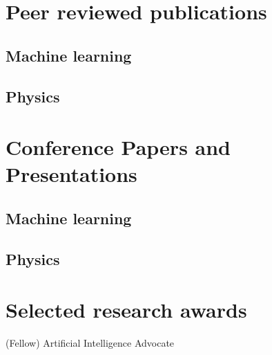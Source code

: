 \documentclass[11pt,letterpaper,roman]{moderncv}        %
\begin{document}



\section{Peer reviewed publications}
\subsection{Machine learning}

\begin{refsection}
  \nocite{*}
  \printbibliography[heading=none]
\end{refsection}

\subsection{Physics}

\begin{refsection}
  \nocite{*}
  \printbibliography[heading=none]
\end{refsection}

\section{Conference Papers and Presentations}
\subsection{Machine learning}

\begin{refsection}
  \nocite{*}
  \printbibliography[heading=none]
\end{refsection}

\subsection{Physics}
\begin{refsection}
  \nocite{*}
  \printbibliography[heading=none]
\end{refsection}

\section{Selected research awards}
\quad (Fellow) Artificial Intelligence Advocate
\end{document}
